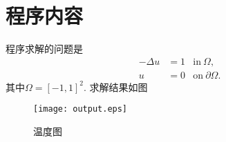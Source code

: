 \documentclass[UTF8]{ctexart}
\begin{document}
\section{程序内容}
程序求解的问题是 
\begin{align*}
  -\Delta u &= 1  & \text{in}\ \Omega,
  \\
  u &= 0  & \text{on}\ \partial\Omega.
\end{align*}
其中$\Omega=[-1,1]^2$.
求解结果如图
\begin{figure}[h]
    \centering
    \texttt{[image: output.eps]}
    \caption{温度图}
    \label{fig:enter-label}
\end{figure}
\end{document}
